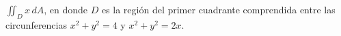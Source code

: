 \item $\iint_D x \, dA$, en donde $D$ es la región del primer cuadrante comprendida entre las circunferencias $x^2 + y^2 = 4$ y $x^2 + y^2 = 2x$.
